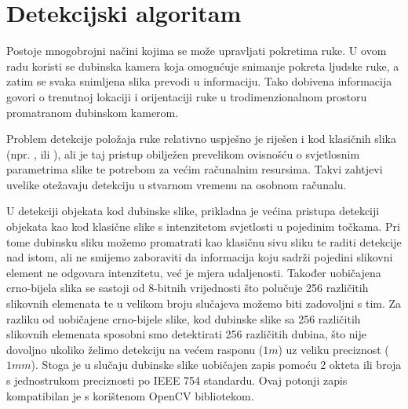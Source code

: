 \documentclass[times, utf8, diplomski, numeric]{fer}
\begin{document}
%
%

\chapter{Detekcijski algoritam}\label{Detekcijski algoritam}
Postoje mnogobrojni načini kojima se može upravljati pokretima ruke. U ovom radu koristi se dubinska kamera koja omogućuje snimanje pokreta ljudske ruke, a zatim se svaka snimljena slika prevodi u informaciju. Tako dobivena informacija govori o trenutnoj lokaciji i orijentaciji ruke u trodimenzionalnom prostoru promatranom dubinskom kamerom.

Problem detekcije položaja ruke relativno uspješno je riješen i kod klasičnih slika (npr. \cite{de2011model}, \cite{stenger2001model} ili \cite{rehg1994visual}), ali je taj pristup obilježen prevelikom ovisnošću o svjetlosnim parametrima slike te potrebom za većim računalnim resursima. Takvi zahtjevi uvelike otežavaju detekciju u stvarnom vremenu na osobnom računalu.

U detekciji objekata kod dubinske slike, prikladna je većina pristupa detekciji objekata kao kod klasične slike s intenzitetom svjetlosti u pojedinim točkama. Pri tome dubinsku sliku možemo promatrati kao klasičnu sivu sliku te raditi detekcije nad istom, ali ne smijemo zaboraviti da informacija koju sadrži pojedini slikovni element ne odgovara intenzitetu, već je mjera udaljenosti. Također uobičajena crno-bijela slika se sastoji od 8-bitnih vrijednosti što polučuje 256 različitih slikovnih elemenata te u velikom broju slučajeva možemo biti zadovoljni s tim. Za razliku od uobičajene crno-bijele slike, kod dubinske slike sa 256 različitih slikovnih elemenata sposobni smo detektirati 256 različitih dubina, što nije dovoljno ukoliko želimo detekciju na većem rasponu ($1m$) uz veliku preciznost ($1mm$). Stoga je u slučaju dubinske slike uobičajen zapis pomoću 2 okteta ili broja s jednostrukom preciznosti po IEEE 754 standardu. Ovaj potonji zapis kompatibilan je s korištenom OpenCV bibliotekom.
\end{document}
